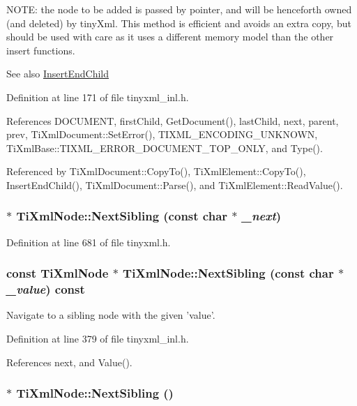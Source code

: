 NOTE: the node to be added is passed by pointer, and will be henceforth owned (and deleted) by tinyXml. This method is efficient and avoids an extra copy, but should be used with care as it uses a different memory model than the other insert functions.

\begin{DoxySeeAlso}{See also}
\hyperlink{class_ti_xml_node_af287a913ce46d8dbf7ef24fec69bbaf0}{InsertEndChild} 
\end{DoxySeeAlso}


Definition at line 171 of file tinyxml\_\-inl.h.

References DOCUMENT, firstChild, GetDocument(), lastChild, next, parent, prev, TiXmlDocument::SetError(), TIXML\_\-ENCODING\_\-UNKNOWN, TiXmlBase::TIXML\_\-ERROR\_\-DOCUMENT\_\-TOP\_\-ONLY, and Type().

Referenced by TiXmlDocument::CopyTo(), TiXmlElement::CopyTo(), InsertEndChild(), TiXmlDocument::Parse(), and TiXmlElement::ReadValue().\hypertarget{class_ti_xml_node_a4080bc5cc8a5c139e7cf308669e850fc}{
\subsubsection[{NextSibling}]{$\ast$ TiXmlNode::NextSibling (const char $\ast$ {\em \_\-next})}}
\label{class_ti_xml_node_a4080bc5cc8a5c139e7cf308669e850fc}


Definition at line 681 of file tinyxml.h.\hypertarget{class_ti_xml_node_acaf9dc17531ac041f602f9ad579573ea}{
\subsubsection[{NextSibling}]{\setlength{\rightskip}{0pt plus 5cm}const {\bf TiXmlNode} $\ast$ TiXmlNode::NextSibling (const char $\ast$ {\em \_\-value}) const}}
\label{class_ti_xml_node_acaf9dc17531ac041f602f9ad579573ea}


Navigate to a sibling node with the given 'value'. 

Definition at line 379 of file tinyxml\_\-inl.h.

References next, and Value().\hypertarget{class_ti_xml_node_a4d05f7b1d7b470ac6887edd072d4892a}{
\subsubsection[{NextSibling}]{$\ast$ TiXmlNode::NextSibling ()}}
\label{class_ti_xml_node_a4d05f7b1d7b470ac6887edd072d4892a}



